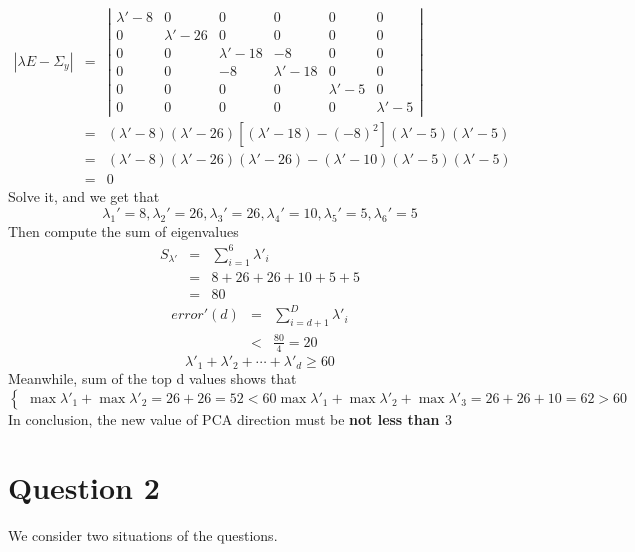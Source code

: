 \documentclass[12pt,letterpaper]{article}
\begin{document}
\begin{eqnarray}
	|\lambda E-\Sigma_y|
	&=& \left|\begin{array}{cccccc}
		\lambda'-8 & 0 & 0 & 0 & 0 & 0\\
		0 & \lambda'-26 & 0 & 0 & 0 & 0\\
		0 & 0 & \lambda'-18 & -8 & 0 & 0\\
		0 & 0 & -8 & \lambda'-18 & 0 & 0\\
		0 & 0 & 0 & 0 & \lambda'-5 & 0\\
		0 & 0 & 0 & 0 & 0 & \lambda'-5
	\end{array}\right|\nonumber\\
	&=& (\lambda'-8)(\lambda'-26)[(\lambda'-18)-(-8)^2](\lambda'-5)(\lambda'-5)\nonumber\\
	&=& (\lambda'-8)(\lambda'-26)(\lambda'-26)-(\lambda'-10)(\lambda'-5)(\lambda'-5)\nonumber\\
	&=& 0\nonumber
\end{eqnarray}
Solve it, and we get that
\begin{equation}
	\lambda_1'=8,
	\lambda_2'=26,
	\lambda_3'=26,
	\lambda_4'=10,
	\lambda_5'=5,
	\lambda_6'=5
\end{equation}
Then compute the sum of eigenvalues
\begin{eqnarray}
	S_{\lambda'}
	&=& \sum^6_{i=1}\lambda'_i\\
	&=& 8+26+26+10+5+5\nonumber\\
	&=& 80\nonumber
\end{eqnarray}
\begin{eqnarray}
	error'(d)
	&=& \sum^D_{i=d+1}\lambda'_i\\
	&<& \frac{80}4=20\nonumber
\end{eqnarray}
\begin{equation}
	\lambda'_1+\lambda'_2+\cdots+\lambda'_d\geq 60
\end{equation}
Meanwhile, sum of the top d values shows that
\begin{equation}
\begin{cases}
	\max\lambda'_1+\max\lambda'_2=26+26=52<60
	\max\lambda'_1+\max\lambda'_2+\max\lambda'_3=26+26+10=62>60
\end{cases}
\end{equation}
In conclusion, the new value of PCA direction must be \textbf{not less than $3$}


\section*{Question 2}
We consider two situations of the questions.
\end{document}
